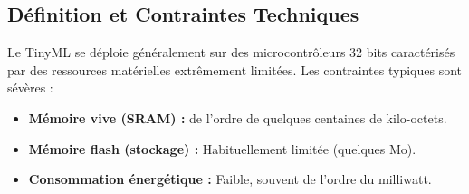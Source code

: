 \subsection{Définition et Contraintes Techniques}

Le TinyML se déploie généralement sur des microcontrôleurs 32 bits caractérisés par des ressources matérielles extrêmement limitées. Les contraintes typiques sont sévères :
\begin{itemize}
\item \textbf{Mémoire vive (SRAM) :} de l'ordre de quelques centaines de kilo-octets.
\item \textbf{Mémoire flash (stockage) :} Habituellement limitée (quelques Mo).
\item \textbf{Consommation énergétique :} Faible, souvent de l'ordre du milliwatt.
\end{itemize}

